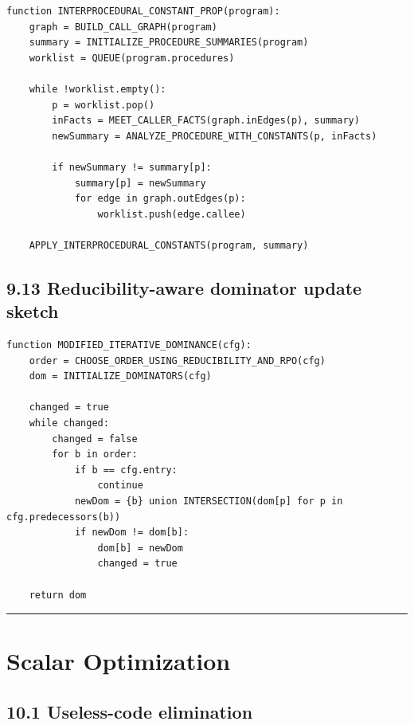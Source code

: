 \documentclass[10pt,letterpaper]{article}
\begin{document}
\begin{verbatim}
function INTERPROCEDURAL_CONSTANT_PROP(program):
    graph = BUILD_CALL_GRAPH(program)
    summary = INITIALIZE_PROCEDURE_SUMMARIES(program)
    worklist = QUEUE(program.procedures)

    while !worklist.empty():
        p = worklist.pop()
        inFacts = MEET_CALLER_FACTS(graph.inEdges(p), summary)
        newSummary = ANALYZE_PROCEDURE_WITH_CONSTANTS(p, inFacts)

        if newSummary != summary[p]:
            summary[p] = newSummary
            for edge in graph.outEdges(p):
                worklist.push(edge.callee)

    APPLY_INTERPROCEDURAL_CONSTANTS(program, summary)
\end{verbatim}

\subsection*{9.13 Reducibility-aware dominator update sketch}
{}

\begin{verbatim}
function MODIFIED_ITERATIVE_DOMINANCE(cfg):
    order = CHOOSE_ORDER_USING_REDUCIBILITY_AND_RPO(cfg)
    dom = INITIALIZE_DOMINATORS(cfg)

    changed = true
    while changed:
        changed = false
        for b in order:
            if b == cfg.entry:
                continue
            newDom = {b} union INTERSECTION(dom[p] for p in cfg.predecessors(b))
            if newDom != dom[b]:
                dom[b] = newDom
                changed = true

    return dom
\end{verbatim}

\medskip\hrule\medskip

\clearpage
\section{Scalar Optimization}

\subsection*{10.1 Useless-code elimination}
{}
\end{document}
